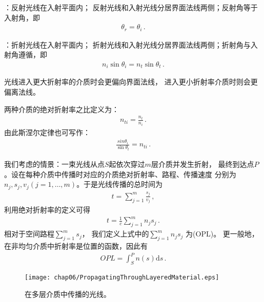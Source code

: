 \begin{proposition}
    ：反射光线在入射平面内；
    反射光线和入射光线分居界面法线两侧；反射角等于入射角，即
    \begin{align}
        \theta_r=\theta_i \, .
    \end{align}
\end{proposition}
\begin{proposition}
    ：折射光线在入射平面内；
    折射光线和入射光线分居界面法线两侧；折射角与入射角遵循，即
    \begin{align}
        n_i\sin\theta_i=n_t\sin\theta_t \, .
    \end{align}
\end{proposition}
\begin{corollary}
    光线进入更大折射率的介质时会更偏向界面法线，
    进入更小折射率介质时则会更偏离法线。
\end{corollary}
\begin{definition}
    两种介质的绝对折射率之比定义为：
    \begin{align}
        n_{ti}=\frac{n_t}{n_i}\, .
    \end{align}
    由此斯涅尔定律也可写作：
    \begin{align}
        \frac{sin\theta_i}{\sin\theta_t}=n_{ti}\, .
    \end{align}
\end{definition}

我们考虑的情景：一束光线从点$S$起依次穿过$m$层介质并发生折射，
最终到达点$P$。设在每种介质中传播时对应的介质绝对折射率、路程、传播速度
分别为$n_j, s_j, v_j (j=1,\ldots,m)$。于是光线传播的总时间为
\begin{align}
    t=\sum\limits_{j=1}^{m}{\frac{s_j}{v_j}}\, ,
\end{align}
利用绝对折射率的定义可得
\begin{align}
    t=\frac{1}{c}\sum\limits_{j=1}^{m}{n_js_j}\, .
\end{align}
相对于空间路程$\sum\limits_{j=1}^{m}{s_j}$，
我们定义上式中的$\sum\limits_{j=1}^{m}{n_js_j}$
为(OPL)。
更一般地，在非均匀介质中折射率是位置的函数，因此有
\begin{align}
    OPL=\int_S^P {n(s)\mathrm{d}s}\, .
\end{align}
\begin{figure}[htbp]
    \centering\texttt{[image: chap06/PropagatingThroughLayeredMaterial.eps]}
    \caption{在多层介质中传播的光线。}
    \label{fig:6.27}
\end{figure}

